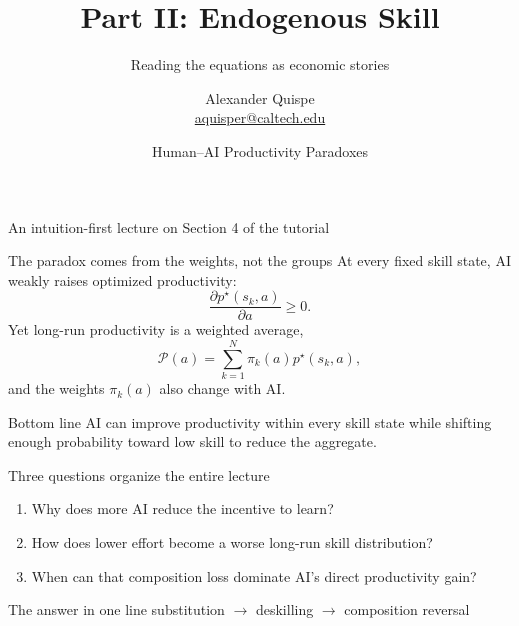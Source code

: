 \documentclass[aspectratio=169,11pt]{beamer}
\title{Part II: Endogenous Skill}
\subtitle{Reading the equations as economic stories}
\author{Alexander Quispe\\[-1mm]\small\href{mailto:aquisper@caltech.edu}{aquisper@caltech.edu}}
\date{\small Human--AI Productivity Paradoxes}
\newcommand{\calP}{\mathcal{P}}
\newcommand{\bottomline}[1]{%
  \begin{alertblock}{Bottom line}
  #1
  \end{alertblock}}
\begin{document}

\begin{frame}[plain]
  \vspace{15mm}
  {\color{white}\inserttitle\par}
  \vspace{3mm}
  {\color{white!88}\insertsubtitle\par}
  \vspace{11mm}
  {\color{white}\large An intuition-first lecture on Section 4 of the tutorial\par}
  \vfill
  {\color{white}\insertauthor\par}
  \vspace{2mm}
  {\color{white!70}\insertdate\par}
\end{frame}

\begin{frame}{The paradox comes from the weights, not the groups}
At every fixed skill state, AI weakly raises optimized productivity:
\[
\frac{\partial p^\star(s_k,a)}{\partial a}\ge 0.
\]
Yet long-run productivity is a weighted average,
\[
\calP(a)=\sum_{k=1}^{N}\pi_k(a)p^\star(s_k,a),
\]
and the weights $\pi_k(a)$ also change with AI.
\bottomline{AI can improve productivity within every skill state while shifting enough probability toward low skill to reduce the aggregate.}
\end{frame}

\begin{frame}{Three questions organize the entire lecture}
\begin{enumerate}
  \item Why does more AI reduce the incentive to learn?
  \item How does lower effort become a worse long-run skill distribution?
  \item When can that composition loss dominate AI's direct productivity gain?
\end{enumerate}
\vspace{5mm}
\begin{exampleblock}{The answer in one line}
\centering
\large substitution $\longrightarrow$ deskilling $\longrightarrow$ composition reversal
\end{exampleblock}
\end{frame}
\end{document}
